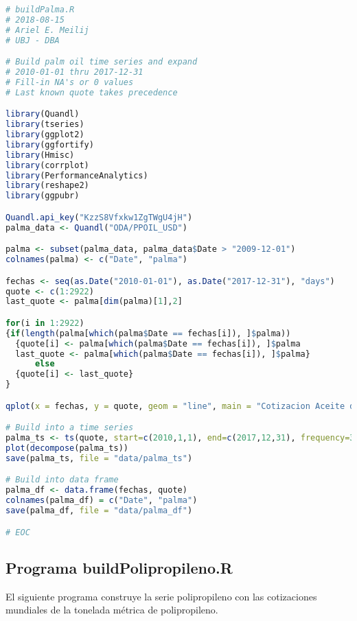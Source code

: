 \begin{lstlisting}[language=R]
# buildPalma.R
# 2018-08-15
# Ariel E. Meilij
# UBJ - DBA

# Build palm oil time series and expand
# 2010-01-01 thru 2017-12-31
# Fill-in NA's or 0 values
# Last known quote takes precedence

library(Quandl)
library(tseries)
library(ggplot2)
library(ggfortify)
library(Hmisc)
library(corrplot)
library(PerformanceAnalytics)
library(reshape2)
library(ggpubr)

Quandl.api_key("KzzS8Vfxkw1ZgTWgU4jH")
palma_data <- Quandl("ODA/PPOIL_USD")

palma <- subset(palma_data, palma_data$Date > "2009-12-01")
colnames(palma) <- c("Date", "palma")

fechas <- seq(as.Date("2010-01-01"), as.Date("2017-12-31"), "days")
quote <- c(1:2922)
last_quote <- palma[dim(palma)[1],2]

for(i in 1:2922)
{if(length(palma[which(palma$Date == fechas[i]), ]$palma))
  {quote[i] <- palma[which(palma$Date == fechas[i]), ]$palma
  last_quote <- palma[which(palma$Date == fechas[i]), ]$palma}
      else
  {quote[i] <- last_quote}
}

qplot(x = fechas, y = quote, geom = "line", main = "Cotizacion Aceite de Palma (2010-2017)")

# Build into a time series
palma_ts <- ts(quote, start=c(2010,1,1), end=c(2017,12,31), frequency=365)
plot(decompose(palma_ts))
save(palma_ts, file = "data/palma_ts")

# Build into data frame
palma_df <- data.frame(fechas, quote)
colnames(palma_df) = c("Date", "palma")
save(palma_df, file = "data/palma_df")

# EOC
\end{lstlisting}

\subsection{Programa buildPolipropileno.R}
El siguiente programa construye la serie polipropileno con las cotizaciones mundiales de la tonelada métrica de polipropileno.

